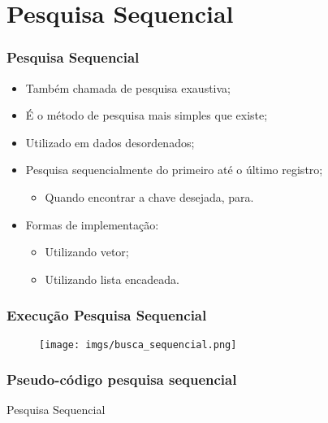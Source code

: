 \documentclass[aspectratio=169]{beamer}
\begin{document}
\section{Pesquisa Sequencial}

\begin{frame}
\frametitle{Pesquisa Sequencial}
\begin{itemize}
\item Também chamada de pesquisa exaustiva;
\item É o método de pesquisa mais simples que existe;
\item Utilizado em dados desordenados;
\item Pesquisa sequencialmente do primeiro até o último registro;
  \begin{itemize}
  \item Quando encontrar a chave desejada, para.
  \end{itemize}
\item Formas de implementação:
  \begin{itemize}
  \item Utilizando vetor;
  \item Utilizando lista encadeada.
  \end{itemize}  
\end{itemize}
\end{frame}


\begin{frame}
\frametitle{Execução Pesquisa Sequencial}
\begin{figure}[!h]
  \centering
  \texttt{[image: imgs/busca\_sequencial.png]}
  \label{fig_pesquisa_sequencial}
\end{figure}

\end{frame}


\begin{frame}
\frametitle{Pseudo-código pesquisa sequencial}
\begin{algorithm}[H]
\caption{Pesquisa Sequencial} 
\label{pesquisa_sequencial}
\end{algorithm}
\end{frame}
\end{document}
